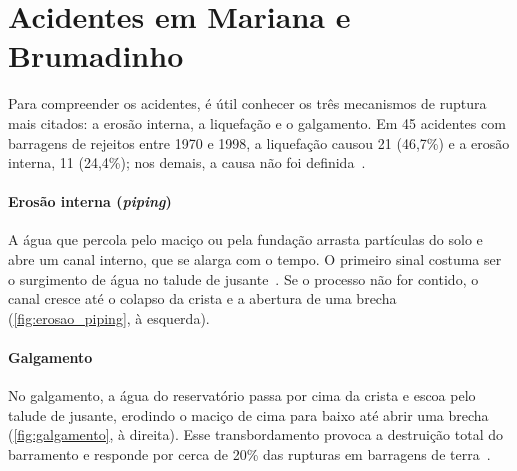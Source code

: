 \section{Acidentes em Mariana e Brumadinho}
\label{sec:acidentes}

Para compreender os acidentes, é útil conhecer os três mecanismos de
ruptura mais citados: a erosão interna, a liquefação e o galgamento. Em
45 acidentes com barragens de rejeitos entre 1970 e 1998, a liquefação
causou 21 (46,7\%) e a erosão interna, 11 (24,4\%); nos demais, a causa
não foi definida~\cite[p.~833]{soares2010}.

\paragraph*{Erosão interna (\textit{piping})}

A água que percola pelo maciço ou pela fundação arrasta partículas do
solo e abre um canal interno, que se alarga com o tempo. O primeiro
sinal costuma ser o surgimento de água no talude de jusante~\cite[p.~850]{soares2010}. Se o processo não for contido, o canal cresce
até o colapso da crista e a abertura de uma brecha
(\autoref{fig:erosao_piping}, à esquerda).

\paragraph*{Galgamento}

No galgamento, a água do reservatório passa por cima da crista e escoa
pelo talude de jusante, erodindo o maciço de cima para baixo até abrir
uma brecha (\autoref{fig:galgamento}, à direita). Esse transbordamento
provoca a destruição total do barramento e responde por cerca de 20\%
das rupturas em barragens de terra~\cite[p.~856 e 866]{soares2010}.

